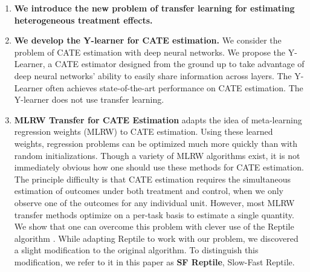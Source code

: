 \begin{enumerate}

\item \textbf{We introduce the new problem of transfer learning for estimating heterogeneous treatment effects.}

\item \textbf{We develop the Y-learner for CATE estimation.} We consider the problem of CATE estimation with deep neural networks. We propose the Y-Learner, a CATE estimator designed from the ground up to take advantage of deep neural networks' ability to easily share information across layers. The Y-Learner often achieves state-of-the-art performance on CATE estimation. The Y-learner does not use transfer learning.



\item \textbf{MLRW Transfer for CATE Estimation} adapts the idea of meta-learning regression weights (MLRW) to CATE estimation. Using these learned weights, regression problems can be optimized much more quickly than with random initializations. Though a variety of MLRW algorithms exist, it is not immediately obvious how one should use these methods for CATE estimation. The principle difficulty is that CATE estimation requires the simultaneous estimation of outcomes under both treatment and control, when we only observe one of the outcomes for any individual unit. However, most MLRW transfer methods optimize on a per-task basis to estimate a single quantity. We show that one can overcome this problem with clever use of the Reptile algorithm \citep{reptile}.%
While adapting Reptile to work with our problem, we discovered a slight modification to the original algorithm. To distinguish this modification, we refer to it in this paper as \textbf{SF Reptile}, Slow-Fast Reptile. 


\end{enumerate}
